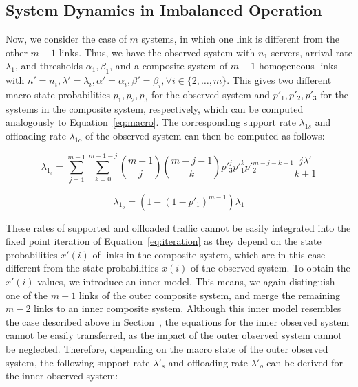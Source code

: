 \subsection{System Dynamics in Imbalanced Operation}\label{sec:aggregation:imbalanced:analytical_model}



Now, we consider the case of $m$ systems, in which one link is different from the other $m-1$ links. Thus, we have the observed system with $n_1$ servers, arrival rate $\lambda_1$, and thresholds $\alpha_1, \beta_1$, and a composite system of $m-1$ homogeneous links with $n'=n_i, \lambda'=\lambda_i, \alpha'=\alpha_i, \beta'=\beta_i, \forall i\in\{2,\ldots,m\}$. This gives two different macro state probabilities $p_1, p_2, p_3$ for the observed system and $p'_1, p'_2, p'_3$ for the systems in the composite system, respectively, which can be computed analogously to Equation~\ref{eq:macro}. The corresponding support rate $\lambda_{1s}$ and offloading rate $\lambda_{1o}$ of the observed system can then be computed as follows:

\small
\begin{equation}
\lambda_{1_s} = \sum_{j=1}^{m-1}\sum_{k=0}^{m-1-j} \binom{m-1}{j}\binom{m-j-1}{k}p'^j_3 p'^k_1 p'^{m-j-k-1}_2\frac{j\lambda'}{k+1}
\end{equation}
\normalsize

\begin{equation}
\lambda_{1_o} = (1-(1-p'_1)^{m-1})\lambda_1
\end{equation}

These rates of supported and offloaded traffic cannot be easily integrated into the fixed point iteration of Equation~\ref{eq:iteration} as they depend on the state probabilities $x'(i)$ of links in the composite system, which are in this case different from the state probabilities $x(i)$ of the observed system.
To obtain the $x'(i)$ values, we introduce an inner model.
This means, we again distinguish one of the $m-1$ links of the outer composite system, and merge the remaining $m-2$ links to an inner composite system. Although this inner model resembles the case described above in Section~, the equations for the inner observed system cannot be easily transferred, as the impact of the outer observed system cannot be neglected. Therefore, depending on the macro state of the outer observed system, the following support rate $\lambda'_s$ and offloading rate $\lambda'_o$ can be derived for the inner observed system:

